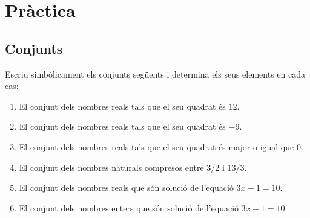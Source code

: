 \chapter{Pràctica}
\label{cap:practica}

\section{Conjunts}

\begin{exercici}
Escriu simb\`{o}licament els conjunts seg\"{u}ents i determina els seus
elements en cada cas:

\begin{enumerate}
\item El conjunt dels nombres reals tals que el seu quadrat \'{e}s $12$.

\item El conjunt dels nombres reals tals que el seu quadrat \'{e}s $-9$.

\item El conjunt dels nombres reals tals que el seu quadrat \'{e}s major o
igual que $0$.

\item El conjunt dels nombres naturals compresos entre $3/2$ i $13/3$.

\item El conjunt dels nombres reals que s\'{o}n soluci\'{o} de l'equaci\'{o}
$3x-1=10$.

\item El conjunt dels nombres enters que s\'{o}n soluci\'{o} de l'equaci\'{o}
$3x-1=10$.
\end{enumerate}
\end{exercici}

